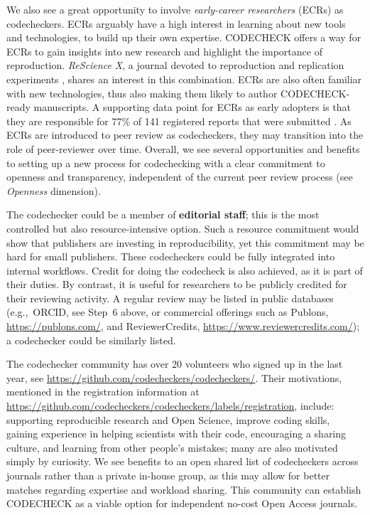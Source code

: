 \documentclass[12pt]{article}
\begin{document}
We also see a great opportunity to involve \emph{early-career
  researchers} (ECRs) as codecheckers.  ECRs arguably have a high
interest in learning about new tools and technologies, to build up
their own expertise.  CODECHECK offers a way for ECRs to gain insights
into new research and highlight the importance of reproduction.
\emph{ReScience X}, a journal devoted to reproduction and replication
experiments \cite{roesch_new_2020}, shares an interest in this
combination.  ECRs are also often familiar with new technologies, thus
also making them likely to author CODECHECK-ready manuscripts.  A
supporting data point for ECRs as early adopters is that they are
responsible for 77\% of 141 registered reports that were submitted
\cite{chambers_registered_2019}.  As ECRs are introduced to peer
review as codecheckers, they may transition into the role of
peer-reviewer over time.  Overall, we see several opportunities
and benefits to setting up a new process for codechecking with a clear
commitment to openness and transparency, independent of the current
peer review process (see \emph{Openness} dimension).

The codechecker could be a member of \textbf{editorial staff}; this is
the most controlled but also resource-intensive option.  Such a
resource commitment would show that publishers are investing in
reproducibility, yet this commitment may be hard for small publishers.
These codecheckers could be fully integrated into internal workflows.
Credit for doing the codecheck is also achieved, as it is part of
their duties.  By contrast, it is useful for researchers to be
publicly credited for their reviewing activity.  A regular review
may be listed in public databases (e.g.,~ORCID, see Step~6 above,
or commercial offerings such as Publons, \url{https://publons.com/}, and
ReviewerCredits, \url{https://www.reviewercredits.com/});
a codechecker could be similarly listed.

The codechecker community has over 20 volunteers who signed up in the last
year, see \url{https://github.com/codecheckers/codecheckers/}.  Their
motivations, mentioned in the registration
information at \url{https://github.com/codecheckers/codecheckers/labels/registration},
include: supporting reproducible research and Open Science, improve
coding skills, gaining experience in helping scientists with their
code, encouraging a sharing culture, and learning from other people's
mistakes; many are also motivated simply by curiosity.  We see
benefits to an open shared list of codecheckers across journals rather
than a private in-house group, as this may allow for better matches
regarding expertise and workload sharing.  
This community can establish CODECHECK as a viable option
for independent no-cost Open Access journals.
\end{document}
